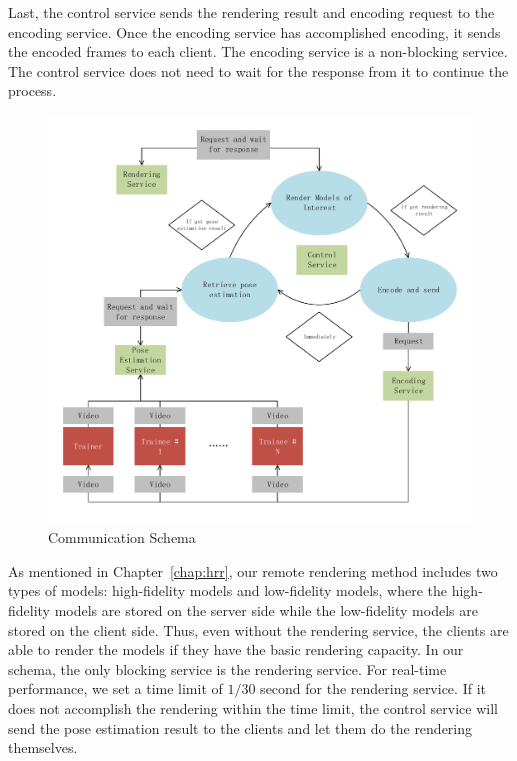 Last, the control service sends the rendering result and encoding request to the encoding service. Once the encoding service has accomplished encoding, it sends the encoded frames to each client.
The encoding service is a non-blocking service. The control service does not need to wait for the response from it to continue the process.

\begin{figure}[!htbp]
	\centering
	\includegraphics[width=\textwidth]{figures/communication_schema.pdf}
	\caption{Communication Schema}
	\label{fig-comm-schem}
\end{figure}

As mentioned in Chapter~\ref{chap:hrr}, our remote rendering method includes two types of models: high-fidelity models and low-fidelity models, where the high-fidelity models are stored on the server side while the low-fidelity models are stored on the client side. Thus, even without the rendering service, the clients are able to render the models if they have the basic rendering capacity.
In our schema, the only blocking service is the rendering service. For real-time performance, we set a time limit of $1/30$ second for the rendering service. If it does not accomplish the rendering within the time limit, the control service will send the pose estimation result to the clients and let them do the rendering themselves.

